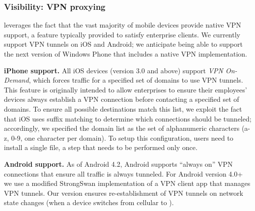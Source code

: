 %


\subsubsection{Visibility: VPN proxying}
\label{subsec:design_visibility}

\meddle leverages the fact that the vast majority of mobile devices provide native VPN support, a feature typically provided to satisfy enterprise clients. We currently support VPN tunnels on iOS and Android; we anticipate being able to support the next version of Windows Phone that includes a native VPN implementation.

\noindent\textbf{iPhone support.} 
All iOS devices (version 3.0 and above) support \textit{VPN On-Demand}, which forces traffic for a specified set of domains to use VPN tunnels. 
This feature is originally intended to allow enterprises to ensure their employees' devices always establish a VPN connection before contacting a specified set of domains. 
To ensure all possible destinations match this list, we exploit the fact that iOS uses suffix matching to determine which connections should be tunneled; accordingly, we specified the domain list as the set of alphanumeric characters (a-z, 0-9, one character per domain). 
To setup this configuration, users need to install a single file, a step that needs to be performed only once. 

\noindent\textbf{Android support.} As of Android 4.2, Android supports ``always on'' VPN connections that ensure all traffic is always tunneled.
For Android version 4.0+ we use a modified StrongSwan implementation of a VPN client app %
that manages VPN tunnels. 
Our version ensures re-establishment of VPN tunnels on network state changes (\eg when a device switches from cellular to \wifi).

